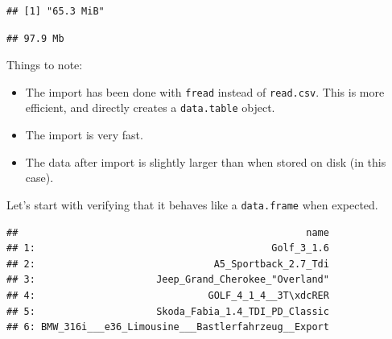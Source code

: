 \documentclass[]{book}
\newenvironment{Shaded}{\begin{snugshade}}{\end{snugshade}}
\newcommand{\KeywordTok}[1]{\textcolor[rgb]{0.13,0.29,0.53}{\textbf{#1}}}
\newcommand{\DataTypeTok}[1]{\textcolor[rgb]{0.13,0.29,0.53}{#1}}
\newcommand{\DecValTok}[1]{\textcolor[rgb]{0.00,0.00,0.81}{#1}}
\newcommand{\StringTok}[1]{\textcolor[rgb]{0.31,0.60,0.02}{#1}}
\newcommand{\CommentTok}[1]{\textcolor[rgb]{0.56,0.35,0.01}{\textit{#1}}}
\newcommand{\OperatorTok}[1]{\textcolor[rgb]{0.81,0.36,0.00}{\textbf{#1}}}
\newcommand{\NormalTok}[1]{#1}
\providecommand{\tightlist}{%
  \setlength{\itemsep}{0pt}\setlength{\parskip}{0pt}}
\theoremstyle{definition}
\theoremstyle{definition}
\theoremstyle{definition}
\theoremstyle{remark}
\begin{document}
\begin{verbatim}
## [1] "65.3 MiB"
\end{verbatim}

\begin{Shaded}
\end{Shaded}

\begin{verbatim}
## 97.9 Mb
\end{verbatim}

Things to note:

\begin{itemize}
\tightlist
\item
  The import has been done with \texttt{fread} instead of
  \texttt{read.csv}. This is more efficient, and directly creates a
  \texttt{data.table} object.
\item
  The import is very fast.
\item
  The data after import is slightly larger than when stored on disk (in
  this case).
\end{itemize}

Let's start with verifying that it behaves like a \texttt{data.frame}
when expected.

\begin{Shaded}
\end{Shaded}

\begin{verbatim}
##                                                  name
## 1:                                         Golf_3_1.6
## 2:                               A5_Sportback_2.7_Tdi
## 3:                     Jeep_Grand_Cherokee_"Overland"
## 4:                              GOLF_4_1_4__3T\xdcRER
## 5:                     Skoda_Fabia_1.4_TDI_PD_Classic
## 6: BMW_316i___e36_Limousine___Bastlerfahrzeug__Export
\end{verbatim}

\begin{Shaded}
\end{Shaded}
\end{document}
